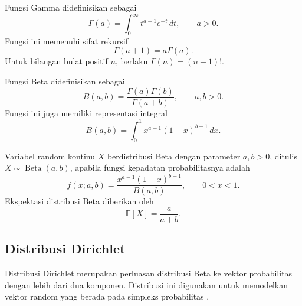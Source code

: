 \begin{definisi}
\label{def:gamma}
Fungsi Gamma didefinisikan sebagai
\begin{equation}
\Gamma(a)=\int_0^\infty t^{a-1}e^{-t}\,dt,
\qquad a>0.
\label{eq:gamma}
\end{equation}
Fungsi ini memenuhi sifat rekursif
\begin{equation}
\Gamma(a+1)=a\Gamma(a).
\label{eq:gammarekursif}
\end{equation}
Untuk bilangan bulat positif $n$, berlaku $\Gamma(n)=(n-1)!$.
\end{definisi}

\begin{definisi}
\label{def:betafungsi}
Fungsi Beta didefinisikan sebagai
\begin{equation}
B(a,b)=\frac{\Gamma(a)\Gamma(b)}{\Gamma(a+b)},
\qquad a,b>0.
\label{eq:betafungsi}
\end{equation}
Fungsi ini juga memiliki representasi integral
\begin{equation}
B(a,b)=\int_0^1 x^{a-1}(1-x)^{b-1}\,dx.
\label{eq:betaintegral}
\end{equation}
\end{definisi}

\begin{definisi}
\label{def:distribusibeta}
Variabel random kontinu $X$ berdistribusi Beta dengan parameter
$a,b>0$, ditulis $X\sim\operatorname{Beta}(a,b)$, apabila fungsi
kepadatan probabilitasnya adalah
\begin{equation}
f(x;a,b)=
\frac{x^{a-1}(1-x)^{b-1}}{B(a,b)},
\qquad 0<x<1.
\label{eq:distribusibeta}
\end{equation}
Ekspektasi distribusi Beta diberikan oleh
\begin{equation}
\mathbb{E}[X]=\frac{a}{a+b}.
\label{eq:ekspektasibeta}
\end{equation}
\end{definisi}


\subsection{Distribusi Dirichlet}
\label{subsec:distribusidirichlet}

Distribusi Dirichlet merupakan perluasan distribusi Beta ke vektor
probabilitas dengan lebih dari dua komponen. Distribusi ini digunakan
untuk memodelkan vektor random yang berada pada simpleks probabilitas
\citep{gelman}.

